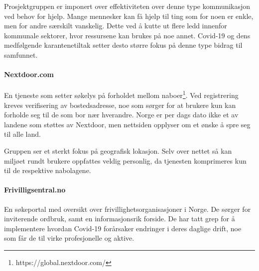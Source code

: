 \vspace{5mm} %

Prosjektgruppen er imponert over effektiviteten over denne type kommunikasjon ved behov for hjelp. Mange mennesker kan få hjelp til ting som for noen er enkle, men for andre særskilt vanskelig. Dette ved å kutte ut flere ledd innenfor kommunale sektorer, hvor ressursene kan brukes på noe annet. Covid-19 og dens medfølgende karantenetiltak setter desto større fokus på denne type bidrag til samfunnet.

\vspace{5mm} %

\paragraph{Nextdoor.com} En tjeneste som setter søkelys på forholdet mellom naboer\footnote{https://global.nextdoor.com/}. Ved registrering kreves verifisering av bostedsadresse, noe som sørger for at brukere kun kan forholde seg til de som bor nær hverandre. Norge er per dags dato ikke et av landene som støttes av Nextdoor, men nettsiden opplyser om et ønske å spre seg til alle land.

\vspace{5mm} %

Gruppen ser et sterkt fokus på geografisk lokasjon. Selv over nettet så kan miljøet rundt brukere oppfattes veldig personlig, da tjenesten komprimeres kun til de respektive nabolagene.

\vspace{5mm} %

\paragraph{Frivilligsentral.no} En søkeportal med oversikt over frivillighetsorganisasjoner i Norge. De sørger for inviterende ordbruk, samt en informasjonsrik forside. De har tatt grep for å implementere hvordan Covid-19 forårsaker endringer i deres daglige drift, noe som får de til virke profesjonelle og aktive.


